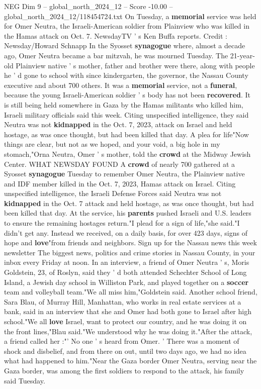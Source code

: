\begin{textsample}{NEG Dim 9 – global\_north\_2024\_12 – Score -10.00 – global\_north\_2024\_12/118454724.txt}  \label{ex:f9_neg_111}
On Tuesday, a \textbf{memorial} service was held for Omer Neutra, the Israeli-American soldier from Plainview who was killed in the Hamas attack on Oct. 7.
NewsdayTV ' s Ken Buffa reports.
Credit : Newsday/Howard Schnapp In the Syosset \textbf{synagogue} where, almost a decade ago, Omer Neutra became a bar mitzvah, he was mourned Tuesday.
The 21-year-old Plainview native ' s mother, father and brother were there, along with people he ' d gone to school with since kindergarten, the governor, the Nassau County executive and about 700 others.
It was a \textbf{memorial} service, not a \textbf{funeral}, because the young Israeli-American soldier ' s body has not been \textbf{recovered}.
It is still being held somewhere in Gaza by the Hamas militants who killed him, Israeli military officials said this week.
Citing unspecified intelligence, they said Neutra was not \textbf{kidnapped} in the Oct. 7, 2023, attack on Israel and held hostage, as was once thought, but had been killed that day.
A plea for life"Now things are clear, but not as we hoped, and your void, a big hole in my stomach,"Orna Neutra, Omer ' s mother, told the \textbf{crowd} at the Midway Jewish Center.
WHAT NEWSDAY FOUND A \textbf{crowd} of nearly 700 gathered at a Syosset \textbf{synagogue} Tuesday to remember Omer Neutra, the Plainview native and IDF member killed in the Oct. 7, 2023, Hamas attack on Israel.
Citing unspecified intelligence, the Israeli Defense Forces said Neutra was not \textbf{kidnapped} in the Oct. 7 attack and held hostage, as was once thought, but had been killed that day.
At the service, his \textbf{parents} pushed Israeli and U.S. leaders to ensure the remaining hostages return."I plead for a sign of life,"she said."I didn't get any.
Instead we received, on a daily basis, for over 423 days, signs of hope and \textbf{love}"from friends and neighbors.
Sign up for the Nassau news this week newsletter The biggest news, politics and crime stories in Nassau County, in your inbox every Friday at noon.
In an interview, a friend of Omer Neutra ' s, Moris Goldstein, 23, of Roslyn, said they ' d both attended Schechter School of Long Island, a Jewish day school in Williston Park, and played together on a \textbf{soccer} team and volleyball team."We all miss him,"Goldstein said.
Another school friend, Sara Blau, of Murray Hill, Manhattan, who works in real estate services at a bank, said in an interview that she and Omer had both gone to Israel after high school."We all \textbf{love} Israel, want to protect our country, and he was doing it on the front lines,"Blau said."We understood why he was doing it."After the attack, a friend called her :"' No one ' s heard from Omer. ' There was a moment of shock and disbelief, and from there on out, until two days ago, we had no idea what had happened to him."Near the Gaza border Omer Neutra, serving near the Gaza border, was among the first soldiers to respond to the attack, his family said Tuesday.

\end{textsample}
